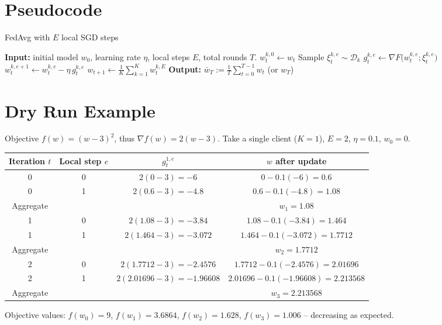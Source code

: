 \documentclass[11pt]{article}
\begin{document}
\section*{Pseudocode}
\begin{algorithm}[H]
\caption{FedAvg with $E$ local SGD steps}
\begin{algorithmic}[1]
\STATE \textbf{Input:} initial model $w_0$, learning rate $\eta$, local steps $E$, total rounds $T$.
        \STATE $w_{t}^{k,0}\leftarrow w_t$
            \STATE Sample $\xi_{t}^{k,e}\sim\mathcal{D}_k$
            \STATE $g_{t}^{k,e}\leftarrow \nabla F\big(w_{t}^{k,e};\xi_{t}^{k,e}\big)$
            \STATE $w_{t}^{k,e+1}\leftarrow w_{t}^{k,e}-\eta\, g_{t}^{k,e}$
        \ENDFOR
    \ENDFOR
    \STATE $w_{t+1}\leftarrow \frac1K\sum_{k=1}^{K} w_{t}^{k,E}$ \hfill{}
\ENDFOR
\STATE \textbf{Output:} $\displaystyle \bar w_T:=\frac1T\sum_{t=0}^{T-1} w_t$ (or $w_T$)
\end{algorithmic}
\end{algorithm}

\section*{Dry Run Example}
Objective $f(w)=(w-3)^2$, thus $\nabla f(w)=2(w-3)$.  
Take a single client ($K=1$), $E=2$, $\eta=0.1$, $w_0=0$.

\begin{center}
\begin{tabular}{c|c|c|c}
Iteration $t$ & Local step $e$ & $g_{t}^{1,e}$ & $w$ after update \\ \hline
0 & 0 & $2(0-3)=-6$ & $0-0.1(-6)=0.6$ \\
0 & 1 & $2(0.6-3)=-4.8$ & $0.6-0.1(-4.8)=1.08$ \\
\hline
Aggregate &  &  & $w_1=1.08$ \\
\hline
1 & 0 & $2(1.08-3)=-3.84$ & $1.08-0.1(-3.84)=1.464$ \\
1 & 1 & $2(1.464-3)=-3.072$ & $1.464-0.1(-3.072)=1.7712$ \\
\hline
Aggregate &  &  & $w_2=1.7712$ \\
\hline
2 & 0 & $2(1.7712-3)=-2.4576$ & $1.7712-0.1(-2.4576)=2.01696$ \\
2 & 1 & $2(2.01696-3)=-1.96608$ & $2.01696-0.1(-1.96608)=2.213568$ \\
\hline
Aggregate &  &  & $w_3=2.213568$ \\
\end{tabular}
\end{center}
Objective values: $f(w_0)=9$, $f(w_1)=3.6864$, $f(w_2)=1.628$, $f(w_3)=1.006$ – decreasing as expected.
\end{document}
